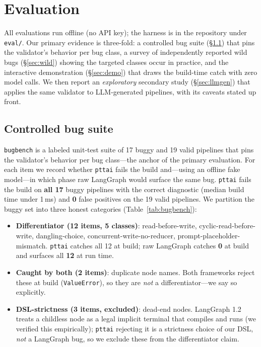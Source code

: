\documentclass[11pt]{article}
\newcommand{\code}[1]{\texttt{#1}}
\begin{document}
\section{Evaluation}
\label{sec:eval}

All evaluations run offline (no API key); the harness is in the repository under
\code{eval/}. Our primary evidence is three-fold: a controlled bug suite
(\S\ref{sec:bugbench}) that pins the validator's behavior per bug class, a survey
of independently reported wild bugs (\S\ref{sec:wild}) showing the targeted
classes occur in practice, and the interactive demonstration (\S\ref{sec:demo})
that draws the build-time catch with zero model calls. We then report an
\emph{exploratory} secondary study (\S\ref{sec:llmgen}) that applies the same
validator to LLM-generated pipelines, with its caveats stated up front.

\subsection{Controlled bug suite}
\label{sec:bugbench}

\code{bugbench} is a labeled unit-test suite of 17 buggy and 19 valid pipelines
that pins the validator's behavior per bug class---the anchor of the primary
evaluation. For each item we record whether \code{pttai} fails the build and---using an
offline fake model---in which phase raw LangGraph would surface the same bug.
\code{pttai} fails the build on \textbf{all 17} buggy pipelines with the correct
diagnostic (median build time under 1\,ms) and \textbf{0} false positives on the
19 valid pipelines. We partition the buggy set into three honest categories
(Table~\ref{tab:bugbench}):

\begin{itemize}[noitemsep,topsep=2pt]
  \item \textbf{Differentiator (12 items, 5 classes)}: read-before-write,
  cyclic-read-before-write, dangling-choice, concurrent-write-no-reducer,
  prompt-placeholder-mismatch. \code{pttai} catches all 12 at build; raw
  LangGraph catches \textbf{0} at build and surfaces all \textbf{12} at run
  time.
  \item \textbf{Caught by both (2 items)}: duplicate node names. Both frameworks
  reject these at build (\code{ValueError}), so they are \emph{not} a
  differentiator---we say so explicitly.
  \item \textbf{DSL-strictness (3 items, excluded)}: dead-end nodes. LangGraph
  1.2 treats a childless node as a legal implicit terminal that compiles and runs
  (we verified this empirically); \code{pttai} rejecting it is a strictness
  choice of our DSL, \emph{not} a LangGraph bug, so we exclude these from the
  differentiator claim.
\end{itemize}
\end{document}
